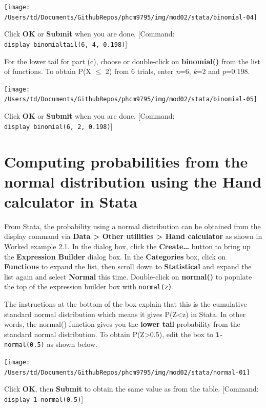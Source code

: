 \documentclass[
]{memoir}
\begin{document}
\texttt{[image: /Users/td/Documents/GithubRepos/phcm9795/img/mod02/stata/binomial-04]}

Click \textbf{OK} or \textbf{Submit} when you are done. {[}Command: \texttt{display\ binomialtail(6,\ 4,\ 0.198)}{]}

For the lower tail for part (c), choose or double-click on \textbf{binomial()} from the list of functions. To obtain P(X \(\le\) 2) from 6 trials, enter \emph{n}=6, \emph{k}=2 and \emph{p}=0.198.

\texttt{[image: /Users/td/Documents/GithubRepos/phcm9795/img/mod02/stata/binomial-05]}

Click \textbf{OK} or \textbf{Submit} when you are done. {[}Command: \texttt{display\ binomial(6,\ 2,\ 0.198)}{]}

\hypertarget{computing-probabilities-from-the-normal-distribution-using-the-hand-calculator-in-stata}{%
\section{Computing probabilities from the normal distribution using the Hand calculator in Stata}\label{computing-probabilities-from-the-normal-distribution-using-the-hand-calculator-in-stata}}

From Stata, the probability using a normal distribution can be obtained from the display command via \textbf{Data \textgreater{} Other utilities \textgreater{} Hand calculator} as shown in Worked example 2.1. In the dialog box, click the \textbf{Create\ldots{}} button to bring up the \textbf{Expression Builder} dialog box. In the \textbf{Categories} box, click on \textbf{Functions} to expand the list, then scroll down to \textbf{Statistical} and expand the list again and select \textbf{Normal} this time. Double-click on \textbf{normal()} to populate the top of the expression builder box with \texttt{normal(z)}.

The instructions at the bottom of the box explain that this is the cumulative standard normal distribution which means it gives P(Z\textless z) in Stata. In other words, the normal() function gives you the \textbf{lower tail} probability from the standard normal distribution. To obtain P(Z\textgreater0.5), edit the box to \texttt{1-normal(0.5)} as shown below.

\texttt{[image: /Users/td/Documents/GithubRepos/phcm9795/img/mod02/stata/normal-01]}

Click \textbf{OK}, then \textbf{Submit} to obtain the same value as from the table. {[}Command: \texttt{display\ 1-normal(0.5)}{]}
\end{document}

